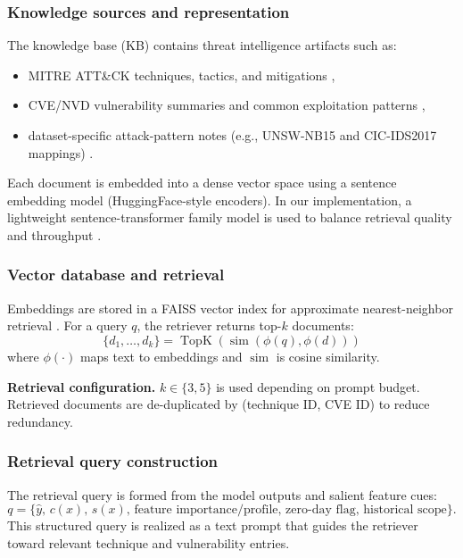 \documentclass[conference]{IEEEtran}
\begin{document}
\subsubsection{Knowledge sources and representation}
The knowledge base (KB) contains threat intelligence artifacts such as:
\begin{itemize}
  \item MITRE ATT\&CK techniques, tactics, and mitigations \cite{MITREATTACK},
  \item CVE/NVD vulnerability summaries and common exploitation patterns \cite{MITRECVE,NISTNVD},
  \item dataset-specific attack-pattern notes (e.g., UNSW-NB15 and CIC-IDS2017 mappings) \cite{Moustafa2015UNSW,Sharafaldin2018CICIDS}.
\end{itemize}
Each document is embedded into a dense vector space using a sentence embedding model (HuggingFace-style encoders). In our implementation, a lightweight sentence-transformer family model is used to balance retrieval quality and throughput \cite{Reimers2019SentenceBERT}.

\subsubsection{Vector database and retrieval}
Embeddings are stored in a FAISS vector index for approximate nearest-neighbor retrieval \cite{Johnson2019FAISS}. For a query $q$, the retriever returns top-$k$ documents:
\begin{equation}
 \{d_1,\dots,d_k\} = \operatorname{TopK}(\operatorname{sim}(\phi(q),\phi(d)))
\end{equation}
where $\phi(\cdot)$ maps text to embeddings and $\operatorname{sim}$ is cosine similarity.

\textbf{Retrieval configuration.} $k\in\{3,5\}$ is used depending on prompt budget. Retrieved documents are de-duplicated by (technique ID, CVE ID) to reduce redundancy.

\subsubsection{Retrieval query construction}
The retrieval query is formed from the model outputs and salient feature cues:
\begin{equation}
 q = \{\hat{y},\,c(x),\,s(x),\,\text{feature importance/profile},\,\text{zero-day flag},\,\text{historical scope}\}.
\end{equation}
This structured query is realized as a text prompt that guides the retriever toward relevant technique and vulnerability entries.
\end{document}
